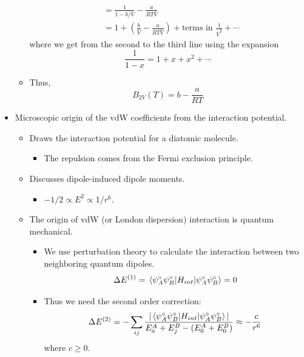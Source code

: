 \documentclass[../notes.tex]{subfiles}
\begin{document}
\begin{itemize}
\begin{itemize}
\begin{align*}
            &= \frac{1}{1-b/\overline{V}}-\frac{a}{RT\overline{V}}\\
            &= 1+\left( \frac{b}{\overline{V}}-\frac{a}{RT\overline{V}} \right)+\text{terms in }\tfrac{1}{\overline{V}^2}+\cdots
        \end{align*}
        where we get from the second to the third line using the expansion
        \begin{equation*}
            \frac{1}{1-x} = 1+x+x^2+\cdots
        \end{equation*}
        \item Thus,
        \begin{equation*}
            B_{2V}(T) = b-\frac{a}{RT}
        \end{equation*}
    \end{itemize}
    \item Microscopic origin of the vdW coefficients from the interaction potential.
    \begin{itemize}
        \item Draws the interaction potential for a diatomic molecule.
        \begin{itemize}
            \item The repulsion comes from the Fermi exclusion principle.
        \end{itemize}
        \item Discusses dipole-induced dipole moments.
        \begin{itemize}
            \item $-1/2\propto E^2\propto 1/r^6$.
        \end{itemize}
        \item The origin of vdW (or London dispersion) interaction is quantum mechanical.
        \begin{itemize}
            \item We use perturbation theory to calculate the interaction between two neighboring quantum dipoles.
            \begin{equation*}
                \Delta E^{(1)} = \ev{H_{int}}{\psi_A^\circ\psi_B^\circ} = 0
            \end{equation*}
            \item Thus we need the second order correction:
            \begin{equation*}
                \Delta E^{(2)} = -\sum_{ij}\frac{|\ev{H_{int}}{\psi_A^\circ\psi_B^\circ}|}{E_a^A+E_j^B-(E_0^A+E_0^B)} \approx -\frac{c}{r^6}
            \end{equation*}
            where $c\geq 0$.
        \end{itemize}
    \end{itemize}
\end{itemize}
\end{document}
